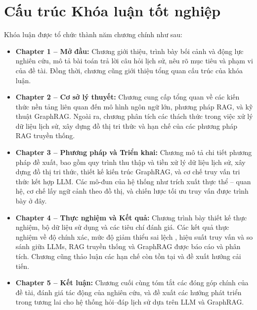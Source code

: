 \section{Cấu trúc Khóa luận tốt nghiệp}
Khóa luận được tổ chức thành năm chương chính như sau:

\begin{itemize}
\item \textbf{Chapter 1 – Mở đầu:}
Chương giới thiệu, trình bày bối cảnh và động lực nghiên cứu, mô tả bài toán trả lời câu hỏi lịch sử, nêu rõ mục tiêu và phạm vi của đề tài. Đồng thời, chương cũng giới thiệu tổng quan cấu trúc của khóa luận.

\item \textbf{Chapter 2 – Cơ sở lý thuyết:}
Chương cung cấp tổng quan về các kiến thức nền tảng liên quan đến mô hình ngôn ngữ lớn, phương pháp RAG, và kỹ thuật GraphRAG. Ngoài ra, chương phân tích các thách thức trong việc xử lý dữ liệu lịch sử, xây dựng đồ thị tri thức và hạn chế của các phương pháp RAG truyền thống.

\item \textbf{Chapter 3 – Phương pháp và Triển khai:}
Chương mô tả chi tiết phương pháp đề xuất, bao gồm quy trình thu thập và tiền xử lý dữ liệu lịch sử, xây dựng đồ thị tri thức, thiết kế kiến trúc GraphRAG, và cơ chế truy vấn tri thức kết hợp LLM. Các mô-đun của hệ thống như trích xuất thực thể – quan hệ, cơ chế lấy ngữ cảnh theo đồ thị, và chiến lược tối ưu truy vấn được trình bày ở đây.

\item \textbf{Chapter 4 – Thực nghiệm và Kết quả:}
Chương trình bày thiết kế thực nghiệm, bộ dữ liệu sử dụng và các tiêu chí đánh giá. Các kết quả thực nghiệm về độ chính xác, mức độ giảm thiểu sai lệch , hiệu suất truy vấn và so sánh giữa LLMs, RAG truyền thống và GraphRAG được báo cáo và phân tích. Chương cũng thảo luận các hạn chế còn tồn tại và đề xuất hướng cải tiến.

\item \textbf{Chapter 5 – Kết luận:}
Chương cuối cùng tóm tắt các đóng góp chính của đề tài, đánh giá tác động của nghiên cứu, và đề xuất các hướng phát triển trong tương lai cho hệ thống hỏi–đáp lịch sử dựa trên LLM và GraphRAG.

\end{itemize}

\newpage
